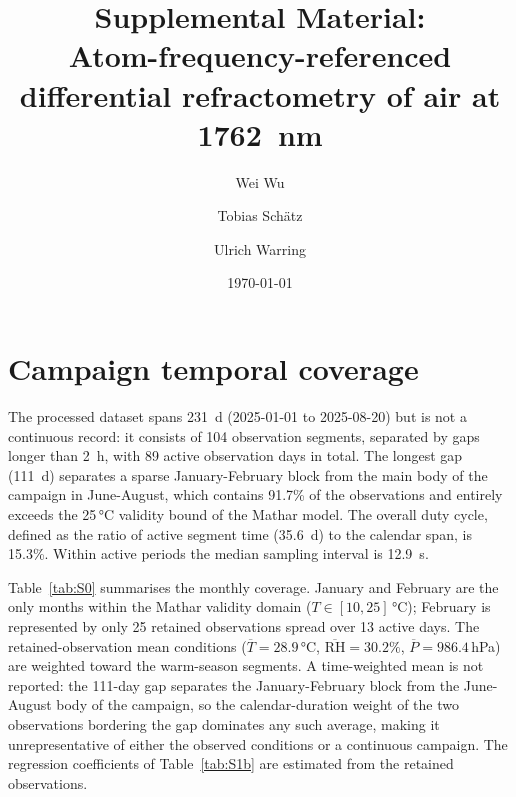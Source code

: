 \documentclass[aps,prapplied,reprint,superscriptaddress]{revtex4-2}
\begin{document}
\title{Supplemental Material: \\
   Atom-frequency-referenced differential refractometry of air at \SI{1762}{\nano\meter}}

\author{Wei Wu}
\author{Tobias Sch{\"a}tz}
\author{Ulrich Warring}

\date{\today}

\maketitle

\section{Campaign temporal coverage}
\label{sec:S0}

The processed dataset spans \SI{231}{\day} (2025-01-01 to 2025-08-20) but is not a continuous record: it consists of 104 observation segments, separated by gaps longer than \SI{2}{\hour}, with 89 active observation days in total. The longest gap (\SI{111}{\day}) separates a sparse January-February block from the main body of the campaign in June-August, which contains 91.7\% of the observations and entirely exceeds the 25\,\si{\celsius} validity bound of the Mathar model. The overall duty cycle, defined as the ratio of active segment time (\SI{35.6}{\day}) to the calendar span, is 15.3\%. Within active periods the median sampling interval is \SI{12.9}{\second}.

Table~\ref{tab:S0} summarises the monthly coverage. January and February are the only months within the Mathar validity domain ($T \in [10,25]\,\si{\celsius}$); February is represented by only 25 retained observations spread over 13 active days. The retained-observation mean conditions ($\overline{T} = 28.9\,\si{\celsius}$, $\overline{\mathrm{RH}} = 30.2\%$, $\overline{P} = 986.4$\,hPa) are weighted toward the warm-season segments. A time-weighted mean is not reported: the 111-day gap separates the January-February block from the June-August body of the campaign, so the calendar-duration weight of the two observations bordering the gap dominates any such average, making it unrepresentative of either the observed conditions or a continuous campaign. The regression coefficients of Table~\ref{tab:S1b} are estimated from the retained observations.
\end{document}
